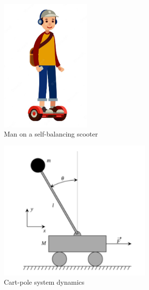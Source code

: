 \documentclass[10pt,a4paper]{article}
\begin{document}
\begin{figure}[H]
	\centering
	\begin{subfigure}[b]{0.3\textwidth}
		\centering
		\includegraphics[width=0.5\textwidth]{figure/scooter}
		\caption{Man on a self-balancing scooter}
		\label{fig:scooter}
	\end{subfigure}
	\hfill
	\begin{subfigure}[b]{0.3\textwidth}
		\centering
		\includegraphics[width=0.85\textwidth]{figure/cart-pole}
		\caption{Cart-pole system dynamics}
		\label{fig:cart-pole}
	\end{subfigure}
	\hfill
	\begin{subfigure}[b]{0.3\textwidth}
		\centering

\end{subfigure}
\end{figure}
\end{document}

